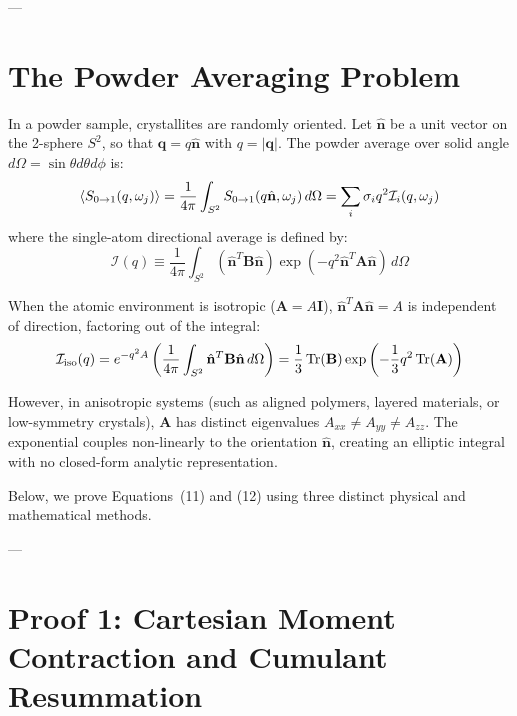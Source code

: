 \documentclass[11pt,a4paper]{article}
\theoremstyle{definition}
\begin{document}
---

\section{The Powder Averaging Problem}

In a powder sample, crystallites are randomly oriented. Let $\hat{\mathbf{n}}$ be a unit vector on the 2-sphere $S^2$, so that $\mathbf{q} = q \hat{\mathbf{n}}$ with $q = |\mathbf{q}|$. The powder average over solid angle $d\Omega = \sin\theta d\theta d\phi$ is:
\begin{equation}
\ev{S_{0 \to 1}(q, \omega_j)} = \frac{1}{4\pi} \int_{S^2} S_{0 \to 1}(q \hat{\mathbf{n}}, \omega_j) \, d\Omega = \sum_i \sigma_i q^2 \mathcal{I}_i(q, \omega_j)
\end{equation}
where the single-atom directional average is defined by:
\begin{equation}
\mathcal{I}(q) \equiv \frac{1}{4\pi} \int_{S^2} (\hat{\mathbf{n}}^T \mathbf{B} \hat{\mathbf{n}}) \exp(-q^2 \hat{\mathbf{n}}^T \mathbf{A} \hat{\mathbf{n}}) \, d\Omega
\label{eq:master_integral}
\end{equation}

When the atomic environment is isotropic ($\mathbf{A} = A \mathbf{I}$), $\hat{\mathbf{n}}^T \mathbf{A} \hat{\mathbf{n}} = A$ is independent of direction, factoring out of the integral:
\begin{equation}
\mathcal{I}_{\text{iso}}(q) = e^{-q^2 A} \left( \frac{1}{4\pi} \int_{S^2} \hat{\mathbf{n}}^T \mathbf{B} \hat{\mathbf{n}} \, d\Omega \right) = \frac{1}{3} \Tr(\mathbf{B}) \exp\left( -\frac{1}{3} q^2 \Tr(\mathbf{A}) \right)
\end{equation}

However, in anisotropic systems (such as aligned polymers, layered materials, or low-symmetry crystals), $\mathbf{A}$ has distinct eigenvalues $A_{xx} \neq A_{yy} \neq A_{zz}$. The exponential couples non-linearly to the orientation $\hat{\mathbf{n}}$, creating an elliptic integral with no closed-form analytic representation.

Below, we prove Equations~(11) and (12) using three distinct physical and mathematical methods.

---

\section{Proof 1: Cartesian Moment Contraction and Cumulant Resummation}
\label{sec:proof1}
\end{document}
